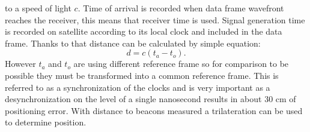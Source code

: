 to a speed of light $c$. Time of arrival is recorded when
data frame wavefront reaches the receiver, this means that receiver time is used.
Signal generation time is recorded on satellite according to its local clock and
included in the data frame. Thanks to that distance can be calculated by simple
equation:
\begin{equation}
	d=c(t_a-t_o).
\end{equation}
However $t_a$ and $t_o$ are using different reference frame so for comparison
to be possible they must be transformed into a common reference frame.
This is referred to as a synchronization of the clocks and is very important as
a desynchronization on the level of a single nanosecond results in about 30 cm of
positioning error\cite{Enge2011}.
With distance to beacons measured a trilateration can be used to determine position.


